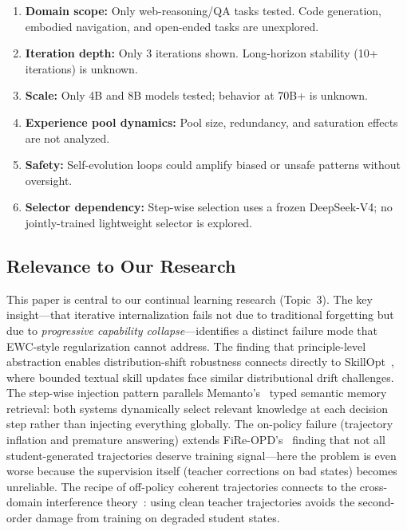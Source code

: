 \documentclass[11pt,a4paper]{article}
\begin{document}
\begin{enumerate}
\item \textbf{Domain scope:} Only web-reasoning/QA tasks tested. Code generation, embodied navigation, and open-ended tasks are unexplored.
\item \textbf{Iteration depth:} Only 3 iterations shown. Long-horizon stability (10+ iterations) is unknown.
\item \textbf{Scale:} Only 4B and 8B models tested; behavior at 70B+ is unknown.
\item \textbf{Experience pool dynamics:} Pool size, redundancy, and saturation effects are not analyzed.
\item \textbf{Safety:} Self-evolution loops could amplify biased or unsafe patterns without oversight.
\item \textbf{Selector dependency:} Step-wise selection uses a frozen DeepSeek-V4; no jointly-trained lightweight selector is explored.
\end{enumerate}

\subsection{Relevance to Our Research}

This paper is central to our continual learning research (Topic~3). The key insight---that iterative internalization fails not due to traditional forgetting but due to \emph{progressive capability collapse}---identifies a distinct failure mode that EWC-style regularization cannot address. The finding that principle-level abstraction enables distribution-shift robustness connects directly to SkillOpt~\cite{skillopt2026}, where bounded textual skill updates face similar distributional drift challenges. The step-wise injection pattern parallels Memanto's~\cite{memanto2026} typed semantic memory retrieval: both systems dynamically select relevant knowledge at each decision step rather than injecting everything globally. The on-policy failure (trajectory inflation and premature answering) extends FiRe-OPD's~\cite{fire2026} finding that not all student-generated trajectories deserve training signal---here the problem is even worse because the supervision itself (teacher corrections on bad states) becomes unreliable. The recipe of off-policy coherent trajectories connects to the cross-domain interference theory~\cite{yang2026perturbation}: using clean teacher trajectories avoids the second-order damage from training on degraded student states.
\end{document}
